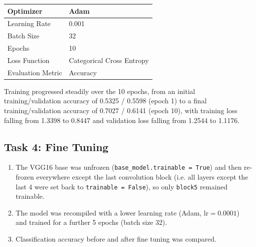 \documentclass[11pt]{article}
\begin{document}
\begin{center}

\begin{tabular}{|p{5cm}|p{6cm}|}

\hline

Optimizer & Adam\\

\hline

Learning Rate & 0.001\\

\hline

Batch Size & 32\\

\hline

Epochs & 10\\

\hline

Loss Function &
Categorical Cross Entropy\\

\hline

Evaluation Metric &
Accuracy\\

\hline

\end{tabular}

\end{center}

Training progressed steadily over the 10 epochs, from an initial
training/validation accuracy of 0.5325 / 0.5598 (epoch 1) to a final
training/validation accuracy of 0.7027 / 0.6141 (epoch 10), with training
loss falling from 1.3398 to 0.8447 and validation loss falling from
1.2544 to 1.1176.


\subsection*{Task 4: Fine Tuning}

\begin{enumerate}

\item The VGG16 base was unfrozen (\texttt{base\_model.trainable = True}) and then re-frozen everywhere except the last convolution block (i.e. all layers except the last 4 were set back to \texttt{trainable = False}), so only \texttt{block5} remained trainable.

\item The model was recompiled with a lower learning rate (Adam, $\text{lr}=0.0001$) and trained for a further 5 epochs (batch size 32).

\item Classification accuracy before and after fine tuning was compared.

\end{enumerate}
\end{document}
